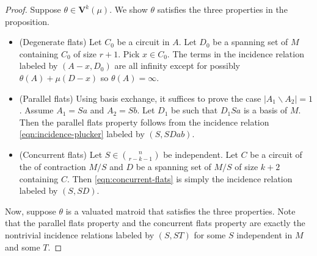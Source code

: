 \documentclass{article}
\theoremstyle{definition}
\newcommand{\nk}[2]{\binom{#1}{#2}}
\newcommand{\bV}{\mathbf V}
\begin{document}
     \begin{proof}
         Suppose $\theta\in \bV^k(\mu)$. We show $\theta$ satisfies the three properties in the proposition. 

        \begin{itemize}
            \item (Degenerate flats)  Let $C_0$ be a circuit in $A$. Let $D_0$ be a spanning set of $M$ containing $C_0$ of size $r+1$. Pick $x\in C_0$. The terms in the incidence relation labeled by $(A-x,D_0)$ are all infinity except for possibly $\theta(A)+\mu(D-x)$ so $\theta(A)=\infty$.

            \item (Parallel flats)  Using basis exchange, it suffices to prove the case $|A_1\smallsetminus A_2|=1$. Assume $A_1=Sa$ and $A_2=Sb$. Let $D_1$ be such that $D_1 Sa$ is a basis of $M$. Then the parallel flats property follows from the incidence relation \eqref{eqn:incidence-plucker} labeled by $(S, S Dab)$.

            \item (Concurrent flats)  Let $S\in \nk{n}{r-k-1}$ be independent. Let $C$ be a circuit of the of contraction $M/S$ and $D$ be a spanning set of $M/S$ of size $k+2$ containing $C$. Then \eqref{eqn:concurrent-flats} is simply the incidence relation labeled by $(S,S D)$. 
            \end{itemize}
         
         
        
         
         Now, suppose $\theta$ is a valuated matroid that satisfies the three properties. Note that the parallel flats property and the concurrent flats property are exactly the nontrivial incidence relations labeled by $(S,S T)$ for some $S$ independent in $M$ and some $T$. 
         

\end{proof}
\end{document}
